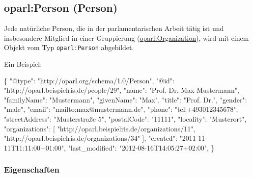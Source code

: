 \documentclass[,a4paper]{article}
\newenvironment{Shaded}{}{}
\newcommand{\DataTypeTok}[1]{\textcolor[rgb]{0.56,0.13,0.00}{{#1}}}
\newcommand{\StringTok}[1]{\textcolor[rgb]{0.25,0.44,0.63}{{#1}}}
\newcommand{\NormalTok}[1]{{#1}}
\begin{document}
\subsection{oparl:Person (Person)}\label{oparlux5fperson}

Jede natürliche Person, die in der parlamentarischen Arbeit tätig ist
und insbesondere Mitglied in einer Gruppierung
(\hyperref[oparlux5forganization]{oparl:Organization}), wird mit einem
Objekt vom Typ \texttt{oparl:Person} abgebildet.

Ein Beispiel:

\begin{Shaded}
\begin{Highlighting}[]
\NormalTok{\{}
    \DataTypeTok{"@type"}\NormalTok{: }\StringTok{"http://oparl.org/schema/1.0/Person"}\NormalTok{,}
    \DataTypeTok{"@id"}\NormalTok{: }\StringTok{"http://oparl.beispielris.de/people/29"}\NormalTok{,}
    \DataTypeTok{"name"}\NormalTok{: }\StringTok{"Prof. Dr. Max Mustermann"}\NormalTok{,}
    \DataTypeTok{"familyName"}\NormalTok{: }\StringTok{"Mustermann"}\NormalTok{,}
    \DataTypeTok{"givenName"}\NormalTok{: }\StringTok{"Max"}\NormalTok{,}
    \DataTypeTok{"title"}\NormalTok{: }\StringTok{"Prof. Dr."}\NormalTok{,}
    \DataTypeTok{"gender"}\NormalTok{: }\StringTok{"male"}\NormalTok{,}
    \DataTypeTok{"email"}\NormalTok{: }\StringTok{"mailto:max@mustermann.de"}\NormalTok{,}
    \DataTypeTok{"phone"}\NormalTok{: }\StringTok{"tel:+493012345678"}\NormalTok{,}
    \DataTypeTok{"streetAddress"}\NormalTok{: }\StringTok{"Musterstraße 5"}\NormalTok{,}
    \DataTypeTok{"postalCode"}\NormalTok{: }\StringTok{"11111"}\NormalTok{,}
    \DataTypeTok{"locality"}\NormalTok{: }\StringTok{"Musterort"}\NormalTok{,}
    \DataTypeTok{"organizations"}\NormalTok{: [}
        \StringTok{"http://oparl.beispielris.de/organizations/11"}\NormalTok{,}
        \StringTok{"http://oparl.beispielris.de/organizations/34"}
    \NormalTok{],}
    \DataTypeTok{"created"}\NormalTok{: }\StringTok{"2011-11-11T11:11:00+01:00"}\NormalTok{,}
    \DataTypeTok{"last_modified"}\NormalTok{: }\StringTok{"2012-08-16T14:05:27+02:00"}\NormalTok{,}
\NormalTok{\}}
\end{Highlighting}
\end{Shaded}

\subsubsection{Eigenschaften}\label{eigenschaften-3}
\end{document}
